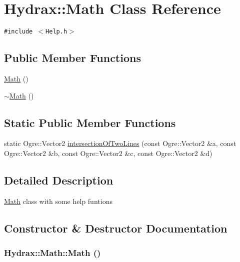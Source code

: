 \hypertarget{class_hydrax_1_1_math}{
\section{Hydrax::Math Class Reference}
\label{class_hydrax_1_1_math}
}
{\tt \#include $<$Help.h$>$}

\subsection*{Public Member Functions}
\begin{CompactItemize}
\item 
\hyperlink{class_hydrax_1_1_math_ae3ea353a3ba97b7d109e16dafd8b045}{Math} ()
\item 
\hyperlink{class_hydrax_1_1_math_dcecdafeffde184a040a4b786ce8f3f6}{$\sim$Math} ()
\end{CompactItemize}
\subsection*{Static Public Member Functions}
\begin{CompactItemize}
\item 
static Ogre::Vector2 \hyperlink{class_hydrax_1_1_math_cf5291c3f843e57405cd575b6149e8b1}{intersectionOfTwoLines} (const Ogre::Vector2 \&a, const Ogre::Vector2 \&b, const Ogre::Vector2 \&c, const Ogre::Vector2 \&d)
\end{CompactItemize}


\subsection{Detailed Description}
\hyperlink{class_hydrax_1_1_math}{Math} class with some help funtions 

\subsection{Constructor \& Destructor Documentation}
\hypertarget{class_hydrax_1_1_math_ae3ea353a3ba97b7d109e16dafd8b045}{
\subsubsection[{Math}]{\setlength{\rightskip}{0pt plus 5cm}Hydrax::Math::Math ()}}
\label{class_hydrax_1_1_math_ae3ea353a3ba97b7d109e16dafd8b045}


